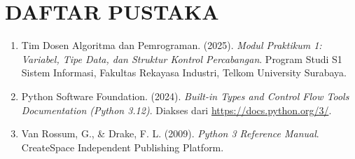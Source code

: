 \documentclass[12pt,a4paper]{article}
\begin{document}
\section{DAFTAR PUSTAKA}

\begin{enumerate}
    \item Tim Dosen Algoritma dan Pemrograman. (2025). \textit{Modul Praktikum 1: Variabel, Tipe Data, dan Struktur Kontrol Percabangan}. Program Studi S1 Sistem Informasi, Fakultas Rekayasa Industri, Telkom University Surabaya.

    \item Python Software Foundation. (2024). \textit{Built-in Types and Control Flow Tools Documentation (Python 3.12)}. Diakses dari \url{https://docs.python.org/3/}.

    \item Van Rossum, G., \& Drake, F. L. (2009). \textit{Python 3 Reference Manual}. CreateSpace Independent Publishing Platform.
\end{enumerate}
\end{document}

